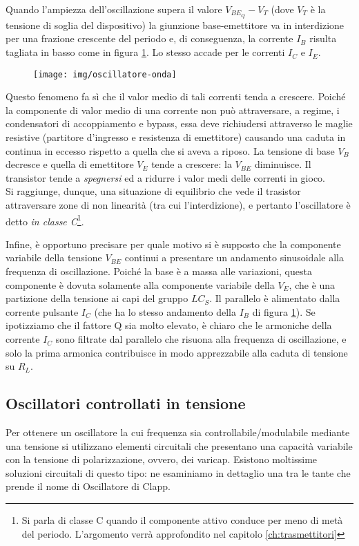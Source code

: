 Quando l'ampiezza dell'oscillazione supera il valore $V_{BE_Q}-V_T$ (dove $V_T$ è la tensione di soglia del dispositivo) la giunzione base-emettitore va in interdizione per una frazione crescente del periodo e, di conseguenza, la corrente $I_B$ risulta tagliata in basso come in figura \ref{fig:oscillatore-onda}.	Lo stesso accade per le correnti $I_C$ e $I_E$.
\begin{figure}[hbt]
	\centering
	\texttt{[image: img/oscillatore-onda]}
	\caption{}
	\label{fig:oscillatore-onda}
\end{figure}
Questo fenomeno fa sì che il valor medio di tali correnti tenda a crescere. Poiché la componente di valor medio di una corrente non può attraversare, a regime, i condensatori di accoppiamento e	bypass, essa deve richiudersi attraverso le maglie resistive (partitore d'ingresso e resistenza di emettitore) causando una caduta in continua in eccesso rispetto a quella che si aveva a riposo.	La tensione di base $V_B$ decresce e quella di emettitore $V_E$ tende a crescere: la $V_{BE}$ diminuisce. Il transistor tende a \textit{spegnersi} ed a ridurre i valor medi delle correnti in gioco.\\
Si raggiunge, dunque, una situazione di equilibrio che vede il trasistor attraversare zone di non linearità (tra cui l'interdizione), e pertanto l'oscillatore è detto \textit{in classe C}\footnote{Si parla di classe C quando il componente attivo conduce per meno di metà del periodo. L'argomento verrà approfondito nel capitolo \ref{ch:trasmettitori}}.

Infine, è opportuno precisare per quale motivo si è supposto che la componente variabile della tensione $V_{BE}$ continui a presentare un andamento sinusoidale alla frequenza di oscillazione. Poiché la base è a massa alle variazioni, questa componente è dovuta solamente alla componente variabile della $V_{E}$, che è una partizione della tensione ai capi del gruppo $LC_S$. Il parallelo è alimentato dalla corrente pulsante $I_C$ (che ha lo stesso andamento della $I_B$ di figura \ref{fig:oscillatore-onda}). Se ipotizziamo
che il fattore Q sia molto elevato, è chiaro che le 	armoniche della corrente $I_C$ sono filtrate dal parallelo che risuona alla frequenza di oscillazione, e solo la prima armonica contribuisce in modo apprezzabile alla caduta di tensione su $R_L$.

\subsection{Oscillatori controllati in tensione} \label{sub:VCO}
Per ottenere un oscillatore la cui frequenza sia controllabile/modulabile mediante una tensione si
utilizzano elementi circuitali che presentano una capacità variabile con la tensione di polarizzazione, ovvero, dei varicap. Esistono moltissime soluzioni circuitali di questo tipo: ne esaminiamo in dettaglio una tra le tante che prende il nome di Oscillatore di Clapp.


